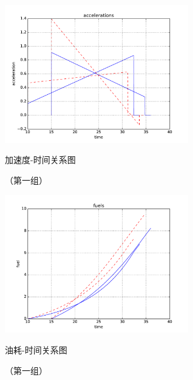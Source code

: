 \begin{figure}[htbp]
\begin{minipage}{0.48\textwidth}
  \centering
  \includegraphics[height=6cm]{figures/sim_case1/acc.pdf}
  \caption{加速度-时间关系图}
  \caption*{\small （第一组）}
  \label{fig:case1:acc}
\end{minipage}\hfill
\begin{minipage}{0.48\textwidth}
  \centering
  \includegraphics[height=6cm]{figures/sim_case1/fuel.pdf}
  \caption{油耗-时间关系图}
  \caption*{\small （第一组）}
  \label{fig:case1:fuel}
\end{minipage}
\end{figure}

